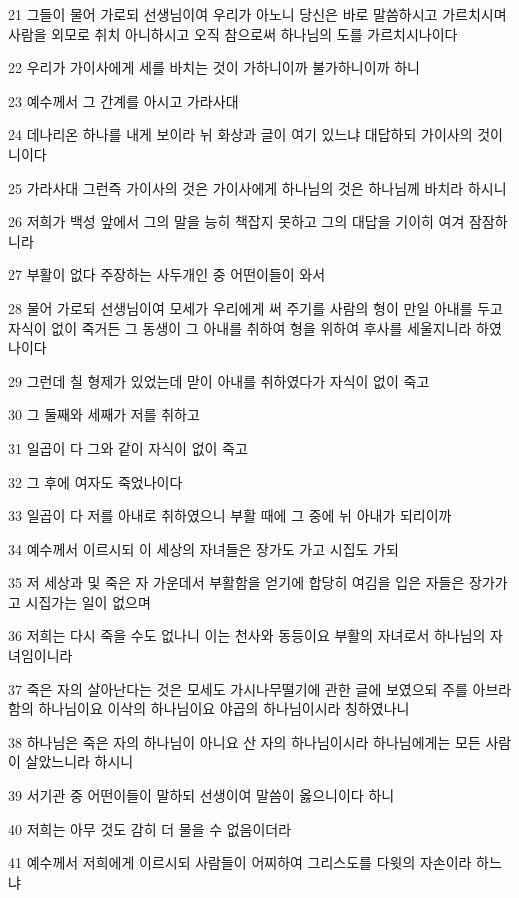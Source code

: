 \par 21 그들이 물어 가로되 선생님이여 우리가 아노니 당신은 바로 말씀하시고 가르치시며 사람을 외모로 취치 아니하시고 오직 참으로써 하나님의 도를 가르치시나이다
\par 22 우리가 가이사에게 세를 바치는 것이 가하니이까 불가하니이까 하니
\par 23 예수께서 그 간계를 아시고 가라사대
\par 24 데나리온 하나를 내게 보이라 뉘 화상과 글이 여기 있느냐 대답하되 가이사의 것이니이다
\par 25 가라사대 그런즉 가이사의 것은 가이사에게 하나님의 것은 하나님께 바치라 하시니
\par 26 저희가 백성 앞에서 그의 말을 능히 책잡지 못하고 그의 대답을 기이히 여겨 잠잠하니라
\par 27 부활이 없다 주장하는 사두개인 중 어떤이들이 와서
\par 28 물어 가로되 선생님이여 모세가 우리에게 써 주기를 사람의 형이 만일 아내를 두고 자식이 없이 죽거든 그 동생이 그 아내를 취하여 형을 위하여 후사를 세울지니라 하였나이다
\par 29 그런데 칠 형제가 있었는데 맏이 아내를 취하였다가 자식이 없이 죽고
\par 30 그 둘째와 세째가 저를 취하고
\par 31 일곱이 다 그와 같이 자식이 없이 죽고
\par 32 그 후에 여자도 죽었나이다
\par 33 일곱이 다 저를 아내로 취하였으니 부활 때에 그 중에 뉘 아내가 되리이까
\par 34 예수께서 이르시되 이 세상의 자녀들은 장가도 가고 시집도 가되
\par 35 저 세상과 및 죽은 자 가운데서 부활함을 얻기에 합당히 여김을 입은 자들은 장가가고 시집가는 일이 없으며
\par 36 저희는 다시 죽을 수도 없나니 이는 천사와 동등이요 부활의 자녀로서 하나님의 자녀임이니라
\par 37 죽은 자의 살아난다는 것은 모세도 가시나무떨기에 관한 글에 보였으되 주를 아브라함의 하나님이요 이삭의 하나님이요 야곱의 하나님이시라 칭하였나니
\par 38 하나님은 죽은 자의 하나님이 아니요 산 자의 하나님이시라 하나님에게는 모든 사람이 살았느니라 하시니
\par 39 서기관 중 어떤이들이 말하되 선생이여 말씀이 옳으니이다 하니
\par 40 저희는 아무 것도 감히 더 물을 수 없음이더라
\par 41 예수께서 저희에게 이르시되 사람들이 어찌하여 그리스도를 다윗의 자손이라 하느냐
